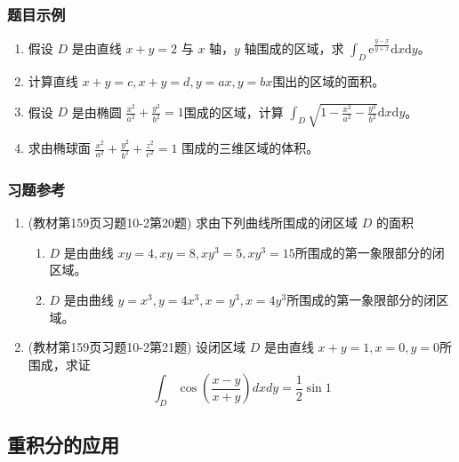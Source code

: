 \subsubsection{题目示例}
\begin{enumerate}
    \item 假设 $D$ 是由直线 $x+y=2$ 与 $x$ 轴，$y$ 轴围成的区域，求 $\int _D \mathrm{e}^{\frac{y-x}{y+x}} \mathrm{d} x \mathrm{d} y$。

    \item 计算直线 $x+y =c, x+y=d, y=ax, y=bx$围出的区域的面积。

    \item 假设 $D$ 是由椭圆 $\frac{x^2}{a^2} + \frac{y^2}{b^2} =1$围成的区域，计算 $\int _D \sqrt{1- \frac{x^2}{a^2} - \frac{y^2}{b^2}} \mathrm{d}x \mathrm{d}y$。

    \item 求由椭球面 $\frac{x^2}{a^2}+\frac{y^2}{b^2}+\frac{z^2}{c^2}=1$ 围成的三维区域的体积。
\end{enumerate}

\subsubsection{习题参考}
\begin{enumerate}
    \item (教材第159页习题10-2第20题) 求由下列曲线所围成的闭区域 $D$ 的面积
    \begin{enumerate}[(1)]
        \item $D$ 是由曲线 $xy=4,xy=8,xy^3=5,xy^3=15$所围成的第一象限部分的闭区域。
        \item $D$ 是由曲线 $y=x^3, y=4x^3, x=y^3, x=4y^3$所围成的第一象限部分的闭区域。 
    \end{enumerate}

    \item (教材第159页习题10-2第21题) 设闭区域 $D$ 是由直线 $x+y=1, x=0, y=0$所围成，求证
    \[
        \int _D \cos \left( \frac{x-y}{x+y} \right) dx dy = \frac{1}{2} \sin 1
    \]
\end{enumerate}

\subsection{重积分的应用}
